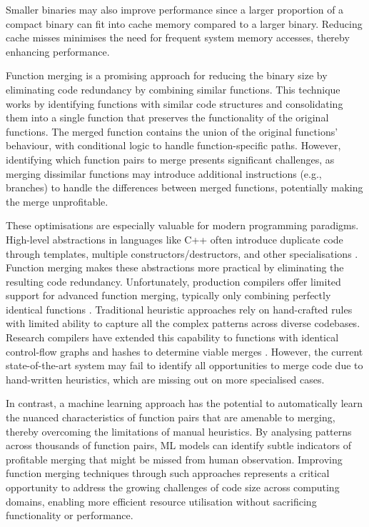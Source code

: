 Smaller binaries may also improve performance since a larger proportion of a compact binary can fit into cache memory compared to a larger binary. Reducing cache misses minimises the need for frequent system memory accesses, thereby enhancing performance.

Function merging is a promising approach for reducing the binary size by eliminating code redundancy by combining similar functions. This technique works by identifying functions with similar code structures and consolidating them into a single function that preserves the functionality of the original functions. The merged function contains the union of the original functions' behaviour, with conditional logic to handle function-specific paths. However, identifying which function pairs to merge presents significant challenges, as merging dissimilar functions may introduce additional instructions (e.g., branches) to handle the differences between merged functions, potentially making the merge unprofitable.

These optimisations are especially valuable for modern programming paradigms. High-level abstractions in languages like C++ often introduce duplicate code through templates, multiple constructors/destructors, and other specialisations \cite{CPPTemplateCodeDuplication}. Function merging makes these abstractions more practical by eliminating the resulting code redundancy. Unfortunately, production compilers offer limited support for advanced function merging, typically only combining perfectly identical functions \cite{LLVMMergeFunctionsPass}. Traditional heuristic approaches rely on hand-crafted rules with limited ability to capture all the complex patterns across diverse codebases. Research compilers have extended this capability to functions with identical control-flow graphs  and hashes to determine viable merges \cite{FunctionMergingIsomorphicCFG}\cite{F3M:FastFocusedFunctionMerging}. However, the current state-of-the-art system may fail to identify all opportunities to merge code due to hand-written heuristics, which are missing out on more specialised cases. 

In contrast, a machine learning approach has the potential to automatically learn the nuanced characteristics of function pairs that are amenable to merging, thereby overcoming the limitations of manual heuristics. By analysing patterns across thousands of function pairs, ML models can identify subtle indicators of profitable merging that might be missed from human observation. Improving function merging techniques through such approaches represents a critical opportunity to address the growing challenges of code size across computing domains, enabling more efficient resource utilisation without sacrificing functionality or performance.

